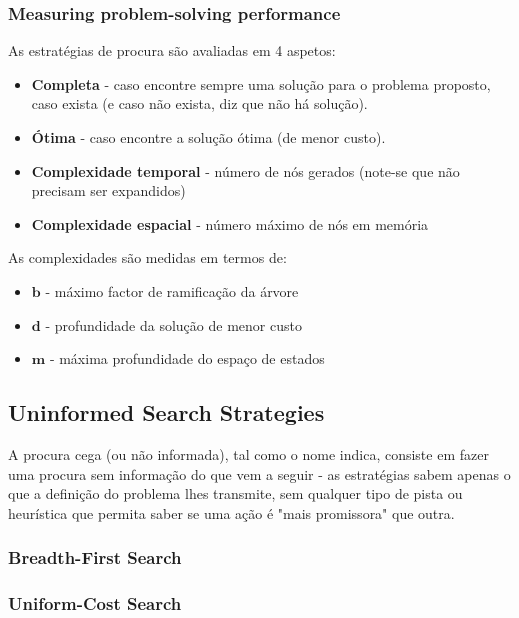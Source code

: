 \documentclass[11pt]{article}
\begin{document}
\subsubsection{Measuring problem-solving performance}

As estratégias de procura são avaliadas em 4 aspetos:
\begin{itemize}[topsep=4pt,itemsep=0pt]
    \item \textbf{Completa} - caso encontre sempre uma solução para o problema proposto, caso exista (e caso não exista, diz que não há solução).
    \item \textbf{Ótima} - caso encontre a solução ótima (de menor custo).
    \item \textbf{Complexidade temporal} - número de nós gerados (note-se que não precisam ser expandidos)
    \item \textbf{Complexidade espacial} - número máximo de nós em memória
\end{itemize}\vspace{4pt}

As complexidades são medidas em termos de:
\begin{itemize}[topsep=4pt,itemsep=0pt]
    \item $\boldsymbol{b}$ - máximo factor de ramificação da árvore
    \item $\boldsymbol{d}$ - profundidade da solução de menor custo
    \item $\boldsymbol{m}$ - máxima profundidade do espaço de estados
\end{itemize}

\subsection{Uninformed Search Strategies}

A procura cega (ou não informada), tal como o nome indica, consiste em fazer uma procura sem informação do que vem a seguir - as estratégias sabem apenas o que a definição do problema lhes transmite, sem qualquer tipo de pista ou heurística que permita saber se uma ação é "mais promissora" que outra.

\subsubsection{Breadth-First Search}


\subsubsection{Uniform-Cost Search}
\end{document}
